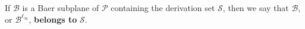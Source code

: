 If $\mathcal{B}$ is a Baer subplane of $\mathcal{P}$ containing the derivation set $\mathcal{S}$, then we say that $\mathcal{B}$, or $\mathcal{B}^{\ell_{\infty}}$, \textbf{belongs to} $\mathcal{S}$.
